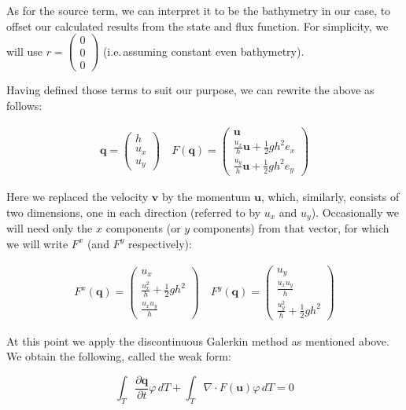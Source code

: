 \documentclass{article}
\newcommand{\pd}[2]{\dfrac{\partial #1}{\partial #2}}
\renewcommand{\phi}{\varphi}
\begin{document}
As for the source term, we can interpret it to be the bathymetry in our case, to offset our calculated results from the state and flux function. For simplicity, we will use $r=
\begin{pmatrix}
  0 \\ 0\\ 0
\end{pmatrix}$ (i.e.\,assuming constant even bathymetry).

Having defined those terms to suit our purpose, we can rewrite the above as follows:

\begin{eqnarray*}
  \label{eqn:shallow-water-flux}
  \mathbf{q} =
  \begin{pmatrix}
    h \\ u_x \\ u_y
  \end{pmatrix} \quad
  F(\mathbf{q}) =
  \begin{pmatrix}
    \mathbf{u} \\ \frac{u_x}{h}\mathbf{u} + \frac{1}{2} g h^2 e_x \\ \frac{u_y}{h}\mathbf{u} + \frac{1}{2} g h^2 e_y
  \end{pmatrix}
\end{eqnarray*}

Here we replaced the velocity $\mathbf{v}$ by the momentum $\mathbf{u}$, which, similarly, consists of two dimensions, one in each direction (referred to by $u_x$ and $u_y$). Occasionally we will need only the $x$ components (or $y$ components) from that vector, for which we will write $F^x$ (and $F^y$ respectively):

\begin{eqnarray*}
  F^x(\mathbf{q}) =
  \begin{pmatrix}
    u_x \\ \frac{u_x^2}{h} + \frac{1}{2} g h^2 \\ \frac{u_x u_y}{h}
  \end{pmatrix}
  \quad
  F^y(\mathbf{q}) =
  \begin{pmatrix}
    u_y \\ \frac{u_x u_y}{h} \\ \frac{u_y^2}{h} + \frac{1}{2} g h^2
  \end{pmatrix}
\end{eqnarray*}

At this point we apply the discontinuous Galerkin method as mentioned above. We obtain the following, called the weak form:

\begin{equation}
  \label{eq:shallow-water-weak-form}
  \int_T \pd{\mathbf{q}}{t} \phi \,dT + \int_T \nabla \cdot F(\mathbf{u}) \phi \,dT = 0
\end{equation}
\end{document}
